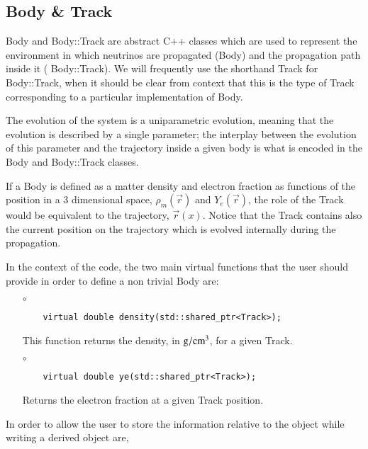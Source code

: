 \subsection{Body \& Track}

{\ttf Body} and {\ttf Body::Track} are abstract {\ttf C++} classes
which are used to represent the environment in which neutrinos
are propagated ({\ttf Body}) and the propagation path inside it ({\ttf
  Body::Track}). We will frequently use the shorthand {\ttf Track} for {\ttf Body::Track},
 when it should be clear from context that this is the type of {\ttf Track} 
 corresponding to a particular implementation of {\ttf Body}.

The evolution of the system is a uniparametric evolution, meaning
that the evolution is described by a single parameter; the
interplay between the evolution of this parameter and the trajectory
inside a given body is what is encoded in the {\ttf Body} and 
{\ttf Body::Track} classes. 

If a {\ttf Body} is defined as a matter density and electron fraction as functions of
the position in a 3 dimensional space, $\rho_m(\vec{r})$ and
$Y_e(\vec{r})$, the role of the {\ttf Track} would be
equivalent to the trajectory, $\vec{r}(x)$.
Notice that the {\ttf Track} contains also the current position on
the trajectory which is evolved internally during the propagation.

In the context of the code, the two main virtual functions that the
user should provide in order to define a non trivial {\ttf Body} are:
\begin{itemize}
\item[$\circ$] 
  \begin{lstlisting}
    virtual double density(std::shared_ptr<Track>);
  \end{lstlisting}
This function returns the density, in ${\rm g}/{\rm cm}^3$, for a
given {\ttf Track}.
\item[$\circ$] 
  \begin{lstlisting}
    virtual double ye(std::shared_ptr<Track>);
  \end{lstlisting}
Returns the electron fraction at a given {\ttf Track} position.
\end{itemize}

In order to allow the user to store the information relative to the
object while writing a derived object are,

